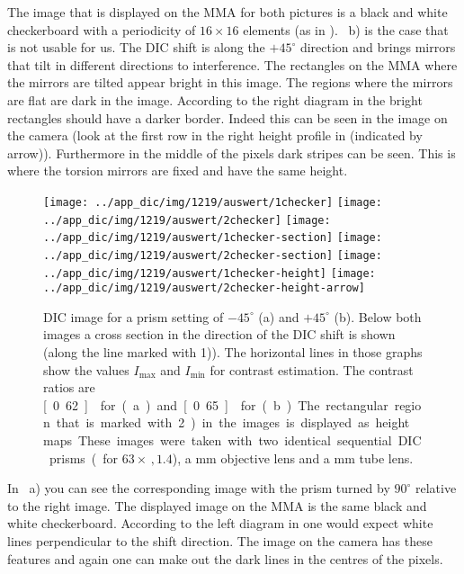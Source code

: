 The image that is displayed on the MMA for both pictures is a black
and white checkerboard with a periodicity of $16\times 16$ elements
(as in ).  ~b) is the case that
is not usable for us. The DIC shift is along the $+45^\circ$ direction
and brings mirrors that tilt in different directions to interference.
The rectangles on the MMA where the mirrors are tilted appear bright
in this image. The regions where the mirrors are flat are dark in the
image. According to the right diagram in  the
bright rectangles should have a darker border. Indeed this can be seen
in the image on the camera (look at the first row in the right height
profile in  (indicated by arrow)). Furthermore in
the middle of the pixels dark stripes can be seen. This is where the
torsion mirrors are fixed and have the same height.

\begin{figure}[p]
  \centering
  \texttt{[image: ../app\_dic/img/1219/auswert/1checker]}
  \texttt{[image: ../app\_dic/img/1219/auswert/2checker]}
  \texttt{[image: ../app\_dic/img/1219/auswert/1checker-section]}
  \texttt{[image: ../app\_dic/img/1219/auswert/2checker-section]}
  \texttt{[image: ../app\_dic/img/1219/auswert/1checker-height]}
  \texttt{[image: ../app\_dic/img/1219/auswert/2checker-height-arrow]}
  \caption{ DIC image for a prism setting of $-45^\circ$ (a) and
    $+45^\circ$ (b). Below both images a cross section in the
    direction of the DIC shift is shown (along the line marked with
    1)). The horizontal lines in those graphs show the values
    $I_\textrm{max}$ and $I_\textrm{min}$ for contrast estimation. The
    contrast ratios are \unit[0.62]{} for (a) and \unit[0.65]{} for
    (b). The rectangular region that is marked with 2) in the images
    is displayed as height maps. These images were taken with two
    identical sequential DIC prisms (for $63\times\,,1.4$), a
    \unit[100]{mm} objective lens and a \unit[300]{mm} tube lens.}
  \label{fig:screen5}
\end{figure}

In ~a) you can see the corresponding image with
the prism turned by $90^\circ$ relative to the right image. The
displayed image on the MMA is the same black and white
checkerboard. According to the left diagram in  one
would expect white lines perpendicular to the shift direction. The
image on the camera has these features and again one can make out the
dark lines in the centres of the pixels.

